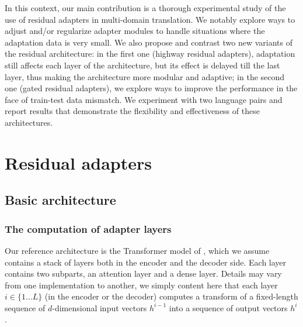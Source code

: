 \documentclass[11pt,a4paper]{article}
\newcommand{\fyDone}[1]{\done[FY]\Todo[FY:]{\textcolor{orange}{#1}}}
\newcommand{\fyFuture}[1]{\done[FY]\Todo[FY:]{\textcolor{red}{#1}}}
\begin{document}
In this context, our main contribution is a thorough experimental study of the use of residual adapters in multi-domain translation. We notably explore ways to adjust and/or regularize adapter modules to handle situations where the adaptation data is very small. We also propose and contrast two new variants of the residual architecture: in the first one (highway residual adapters), adaptation still affects each layer of the architecture, but its effect is delayed till the last layer, thus making the architecture more modular and adaptive; in the second one (gated residual adapters), we explore ways to improve the performance in the face of train-test data mismatch. We experiment with two language pairs and report results that demonstrate the flexibility and effectiveness of these architectures. 
\fyDone{One bit of a conclusion here}\fyFuture{Build a proper training scenario for these two conditions}

\section{Residual adapters \label{sec:res}}

\subsection{Basic architecture \label{ssec:architecture}}
\fyDone{More contexts and notations from the transformer}\fyDone{Encoder / decoder layers}

\subsubsection{The computation of adapter layers}
Our reference architecture is the Transformer model of \cite{Vaswani17attention}, which we assume contains a stack of layers both in the encoder and the decoder side. Each layer contains two subparts, an attention layer and a dense layer. Details may vary from one implementation to another, we simply content here that each layer $i \in \{1 \dots L\}$ (in the encoder or the decoder) computes a transform of a fixed-length sequence of $d$-dimensional input vectors $h^{i-1}$ into a sequence of output vectors $h^{i}$.
\end{document}
